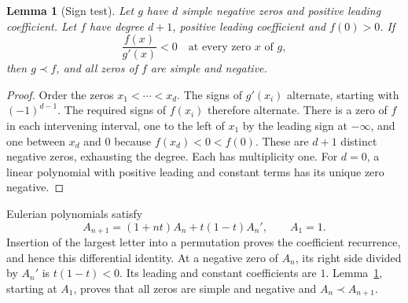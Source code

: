 \documentclass[12pt]{amsart}
\newtheorem{lem}[thm]{Lemma}
\theoremstyle{definition}
\theoremstyle{remark}
\numberwithin{equation}{section}
\begin{document}
\begin{samepage}
\begin{lem}[Sign test]\label{en-sign}
Let $g$ have $d$ simple negative zeros and positive leading coefficient. Let $f$ have degree $d+1$, positive leading coefficient and $f(0)>0$. If
\[
 \frac{f(x)}{g'(x)}<0\quad\text{at every zero }x\text{ of }g,
\]
then $g\prec f$, and all zeros of $f$ are simple and negative.
\end{lem}
\end{samepage}
\begin{proof}
Order the zeros $x_1<\cdots<x_d$. The signs of $g'(x_i)$ alternate, starting with $(-1)^{d-1}$. The required signs of $f(x_i)$ therefore alternate. There is a zero of $f$ in each intervening interval, one to the left of $x_1$ by the leading sign at $-\infty$, and one between $x_d$ and $0$ because $f(x_d)<0<f(0)$. These are $d+1$ distinct negative zeros, exhausting the degree. Each has multiplicity one. For $d=0$, a linear polynomial with positive leading and constant terms has its unique zero negative.
\end{proof}

Eulerian polynomials satisfy
\begin{equation}\label{en-euler-recurrence}
 A_{n+1}=(1+nt)A_n+t(1-t)A_n',\qquad A_1=1.
\end{equation}
Insertion of the largest letter into a permutation proves the coefficient recurrence, and hence this differential identity. At a negative zero of $A_n$, its right side divided by $A_n'$ is $t(1-t)<0$. Its leading and constant coefficients are $1$. Lemma~\ref{en-sign}, starting at $A_1$, proves that all zeros are simple and negative and $A_n\prec A_{n+1}$.
\end{document}
